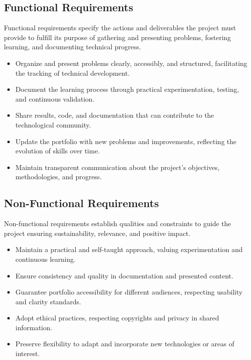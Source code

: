 \documentclass[10pt, a4paper, oneside]{article}
\begin{document}
\subsection{Functional Requirements}

Functional requirements specify the actions and deliverables the project must provide to fulfill its purpose of gathering and presenting problems, fostering learning, and documenting technical progress.

\begin{itemize}
    \item Organize and present problems clearly, accessibly, and structured, facilitating the tracking of technical development.
    \item Document the learning process through practical experimentation, testing, and continuous validation.
    \item Share results, code, and documentation that can contribute to the technological community.
    \item Update the portfolio with new problems and improvements, reflecting the evolution of skills over time.
    \item Maintain transparent communication about the project’s objectives, methodologies, and progress.
\end{itemize}

\subsection{Non-Functional Requirements}

Non-functional requirements establish qualities and constraints to guide the project ensuring sustainability, relevance, and positive impact.

\begin{itemize}
    \item Maintain a practical and self-taught approach, valuing experimentation and continuous learning.
    \item Ensure consistency and quality in documentation and presented content.
    \item Guarantee portfolio accessibility for different audiences, respecting usability and clarity standards.
    \item Adopt ethical practices, respecting copyrights and privacy in shared information.
    \item Preserve flexibility to adapt and incorporate new technologies or areas of interest.
\end{itemize}
\end{document}
